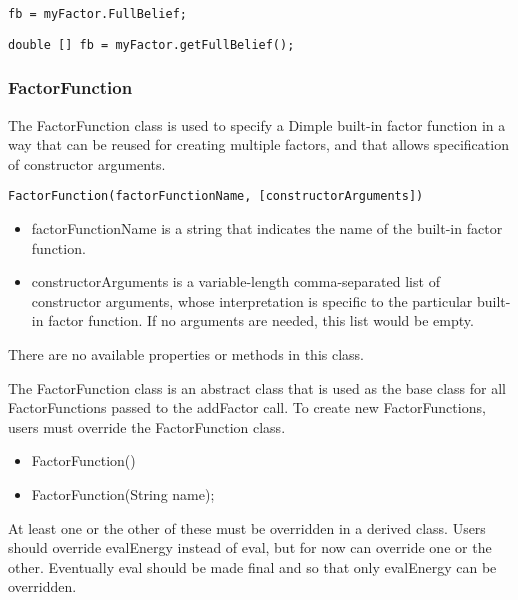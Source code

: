 \ifmatlab
\begin{lstlisting}
fb = myFactor.FullBelief;
\end{lstlisting}
\fi

\ifjava
\begin{lstlisting}
double [] fb = myFactor.getFullBelief();
\end{lstlisting}
\fi

\subsubsection{FactorFunction}
\label{sec:FactorFunction}

\ifmatlab

The FactorFunction class is used to specify a Dimple built-in factor function in a way that can be reused for creating multiple factors, and that allows specification of constructor arguments.


\begin{lstlisting}
FactorFunction(factorFunctionName, [constructorArguments])
\end{lstlisting}

\begin{itemize}
\item factorFunctionName is a string that indicates the name of the built-in factor function.
\item constructorArguments is a variable-length comma-separated list of constructor arguments, whose interpretation is specific to the particular built-in factor function.  If no arguments are needed, this list would be empty.
\end{itemize}

There are no available properties or methods in this class.

\fi

\ifjava
The FactorFunction class is an abstract class that is used as the base class for all FactorFunctions passed to the addFactor call.  To create new FactorFunctions, users must override the FactorFunction class.


\begin{itemize}
\item FactorFunction()
\item FactorFunction(String name);
\end{itemize}


At least one or the other of these must be overridden in a derived class.  Users should override evalEnergy instead of eval, but for now can override one or the other.  Eventually eval should be made final and so that only evalEnergy can be overridden.

